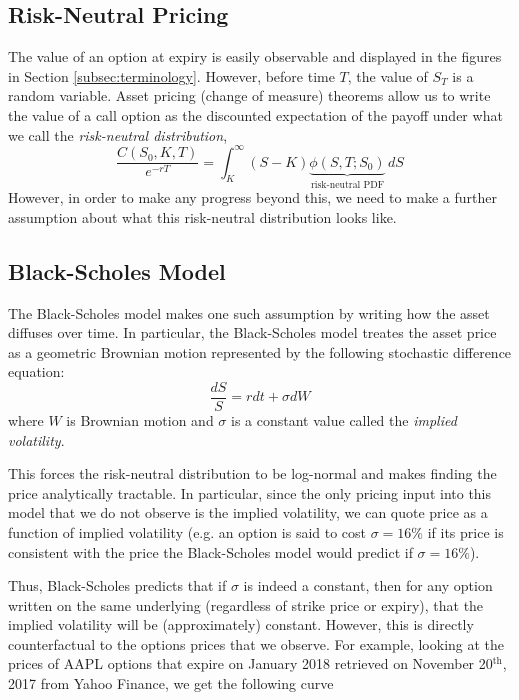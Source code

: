 \documentclass[12pt]{article}
\numberwithin{equation}{section}
\begin{document}
\subsection{Risk-Neutral Pricing}
\label{subsec:riskneutral}

The value of an option at expiry is easily observable and displayed in the
figures in Section \ref{subsec:terminology}. However, before time $T$, the
value of $S_T$ is a random variable. Asset pricing (change of measure) 
theorems
allow us to write the value of a call option as the discounted expectation of
the payoff under what we call the \emph{risk-neutral distribution},
\begin{equation}
 \frac{C(S_0, K, T)}{e^{-rT}} = \int_K^\infty (S - K)
\underbrace{\phi(S, T; S_0)}_\text{risk-neutral PDF} \, dS
\label{eqn:riskneutralpricing}
\end{equation}
However, in order to make any progress beyond this, we need to make a further
assumption about what this risk-neutral distribution looks like.

\subsection{Black-Scholes Model}
\label{subsec:bs}
The Black-Scholes model makes one such assumption by writing how the asset
diffuses over time. In particular, the Black-Scholes model treates the asset
price as a geometric Brownian motion represented by the following stochastic difference equation:
\begin{equation}
 \frac{dS}{S} = r dt + \sigma dW 
\end{equation}
where $W$ is Brownian motion and $\sigma$ is a constant value called the \emph{implied
volatility}. 

This forces the risk-neutral distribution to be log-normal and makes
finding the price analytically tractable. In particular, since the only pricing
input into this model that we do not observe is the implied volatility, we can
quote price as a function of implied volatility (e.g. an option is said to cost
$\sigma=16\%$ if its price is consistent with the price the Black-Scholes model
would predict if $\sigma=16\%$).

Thus, Black-Scholes predicts that if $\sigma$ is indeed a constant, then for any
option written on the same underlying (regardless of strike price or expiry),
that the implied volatility will be (approximately) constant. However, this is
directly counterfactual to the options prices that we observe. For example,
looking at the prices of AAPL options that expire on January 2018 retrieved on
November 20$^\text{th}$, 2017 from Yahoo Finance, we get the following curve
\end{document}
